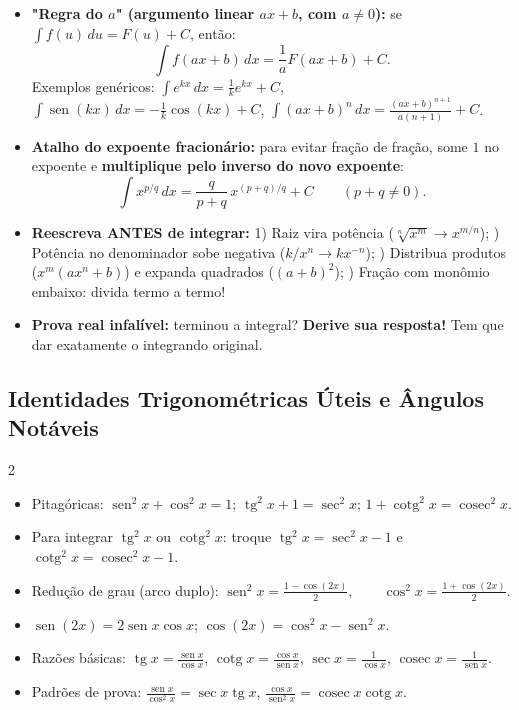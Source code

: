 \documentclass[10pt,a4paper]{article}
\DeclareMathOperator{\sen}{sen}
\DeclareMathOperator{\tg}{tg}
\DeclareMathOperator{\cotg}{cotg}
\DeclareMathOperator{\cosec}{cosec}
\begin{document}
\begin{dica}
    \begin{itemize}
        \item \textbf{"Regra do $a$" (argumento linear $ax + b$, com $a \neq 0$):} se $\int f(u)\,du = F(u)+C$, então:
              \[
                  \int f(ax+b)\,dx = \frac{1}{a} F(ax+b) + C.
              \]
              Exemplos genéricos: $\displaystyle \int e^{kx}\,dx = \frac{1}{k}e^{kx} + C$, \quad $\displaystyle \int \sen(kx)\,dx = -\frac{1}{k}\cos(kx) + C$, \quad $\displaystyle \int (ax+b)^n\,dx = \frac{(ax+b)^{n+1}}{a(n+1)} + C$.
        \item \textbf{Atalho do expoente fracionário:} para evitar fração de fração, some $1$ no expoente e \textbf{multiplique pelo inverso do novo expoente}:
              \[
                  \int x^{p/q}\,dx = \frac{q}{p+q}\,x^{(p+q)/q} + C \qquad (p+q \neq 0).
              \]
        \item \textbf{Reescreva ANTES de integrar:}
              1) Raiz vira potência ($\sqrt[n]{x^m} \to x^{m/n}$); ) Potência no denominador sobe negativa ($k/x^n \to k x^{-n}$); ) Distribua produtos ($x^m(ax^n + b)$) e expanda quadrados ($(a+b)^2$); ) Fração com monômio embaixo: divida termo a termo!
        \item \textbf{Prova real infalível:} terminou a integral? \textbf{Derive sua resposta!} Tem que dar exatamente o integrando original.
    \end{itemize}
\end{dica}

\subsection{Identidades Trigonométricas Úteis e Ângulos Notáveis}
\begin{multicols}{2}
\begin{itemize}
    \item Pitagóricas: $\sen^2 x + \cos^2 x = 1$; \quad $\tg^2 x + 1 = \sec^2 x$; \quad $1 + \cotg^2 x = \cosec^2 x$.
    \item Para integrar $\tg^2 x$ ou $\cotg^2 x$: troque $\tg^2 x = \sec^2 x - 1$ e $\cotg^2 x = \cosec^2 x - 1$.
    \item Redução de grau (arco duplo):
          $\displaystyle \sen^2 x = \frac{1 - \cos(2x)}{2}, \qquad \cos^2 x = \frac{1 + \cos(2x)}{2}$.
\end{itemize}
\columnbreak
\begin{itemize}
    \item $\sen(2x) = 2\sen x \cos x$; \quad $\cos(2x) = \cos^2 x - \sen^2 x$.
    \item Razões básicas: $\tg x = \frac{\sen x}{\cos x}$, $\cotg x = \frac{\cos x}{\sen x}$, $\sec x = \frac{1}{\cos x}$, $\cosec x = \frac{1}{\sen x}$.
    \item Padrões de prova: $\displaystyle \frac{\sen x}{\cos^2 x} = \sec x \tg x$, \qquad $\displaystyle \frac{\cos x}{\sen^2 x} = \cosec x \cotg x$.
\end{itemize}
\end{multicols}
\end{document}
